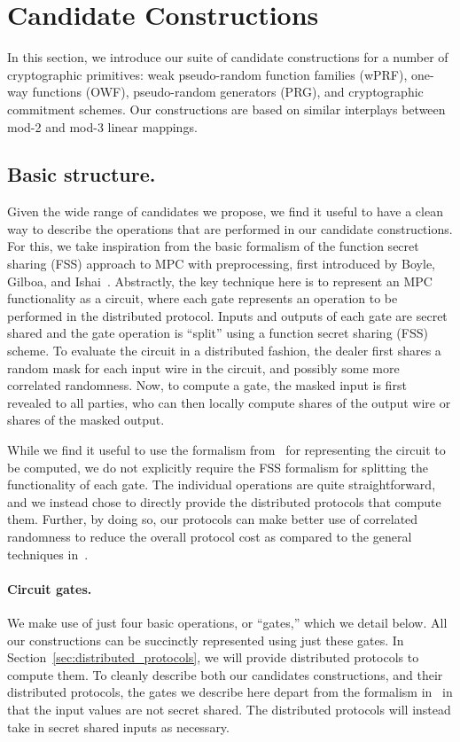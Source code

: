 
\newpage

\section{Candidate Constructions}
In this section, we introduce our suite of candidate constructions for a number of cryptographic primitives: weak pseudo-random function families (wPRF), one-way functions (OWF), pseudo-random generators (PRG), and cryptographic commitment schemes. Our constructions are based on similar interplays between mod-2 and mod-3 linear mappings. 

\subsection{Basic structure.}
Given the wide range of candidates we propose, we find it useful to have a clean way to describe the operations that are performed in our candidate constructions. For this, we take inspiration from the basic formalism of the function secret sharing (FSS) approach to MPC with preprocessing, first introduced by Boyle, Gilboa, and Ishai~\cite{boyle2019-fss-preprocess}. Abstractly, the key technique here is to represent an MPC functionality as a circuit, where each gate represents an operation to be performed in the distributed protocol. Inputs and outputs of each gate are secret shared and the gate operation is ``split'' using a function secret sharing (FSS) scheme. To evaluate the circuit in a distributed fashion, the dealer first shares a random mask for each input wire in the circuit, and possibly some more correlated randomness. Now, to compute a gate, the masked input is first revealed to all parties, who can then locally compute shares of the output wire or shares of the masked output.

While we find it useful to use the formalism from~\cite{boyle2019-fss-preprocess} for representing the circuit to be computed, we do not explicitly require the FSS formalism for splitting the functionality of each gate. The individual operations are quite straightforward, and we instead chose to directly provide the distributed protocols that compute them. Further, by doing so, our protocols can make better use of correlated randomness to reduce the overall protocol cost as compared to the general techniques in~\cite{boyle2019-fss-preprocess}.


\paragraph{Circuit gates.}
We make use of just four basic operations, or ``gates,'' which we detail below. All our constructions can be succinctly represented using just these gates. In Section~\ref{sec:distributed_protocols}, we will provide distributed protocols to compute them. To cleanly describe both our candidates constructions, and their distributed protocols, the gates we describe here depart from the formalism in~\cite{boyle2019-fss-preprocess} in that the input values are not secret shared. The distributed protocols will instead take in secret shared inputs as necessary.

